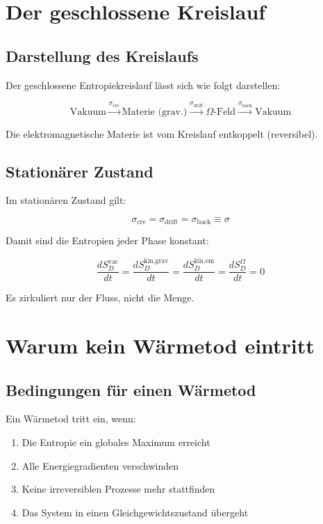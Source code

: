 \section{Der geschlossene Kreislauf}

\subsection{Darstellung des Kreislaufs}

Der geschlossene Entropiekreislauf lässt sich wie folgt darstellen:

\[
\text{Vakuum} \xrightarrow{\sigma_{\text{cre}}} \text{Materie (grav.)} \xrightarrow{\sigma_{\text{drift}}} \Omega\text{-Feld} \xrightarrow{\sigma_{\text{back}}} \text{Vakuum}
\]

Die elektromagnetische Materie ist vom Kreislauf entkoppelt (reversibel).

\subsection{Stationärer Zustand}

Im stationären Zustand gilt:

\[
\sigma_{\text{cre}} = \sigma_{\text{drift}} = \sigma_{\text{back}} \equiv \sigma \tag{M.14}
\]

Damit sind die Entropien jeder Phase konstant:

\[
\frac{dS_D^{\text{vac}}}{dt} = \frac{dS_D^{\text{kin,grav}}}{dt} = \frac{dS_D^{\text{kin,em}}}{dt} = \frac{dS_D^{\Omega}}{dt} = 0 \tag{M.15}
\]

Es zirkuliert nur der Fluss, nicht die Menge.

\section{Warum kein Wärmetod eintritt}

\subsection{Bedingungen für einen Wärmetod}

Ein Wärmetod tritt ein, wenn:
\begin{enumerate}
    \item Die Entropie ein globales Maximum erreicht
    \item Alle Energiegradienten verschwinden
    \item Keine irreversiblen Prozesse mehr stattfinden
    \item Das System in einen Gleichgewichtszustand übergeht
\end{enumerate}


